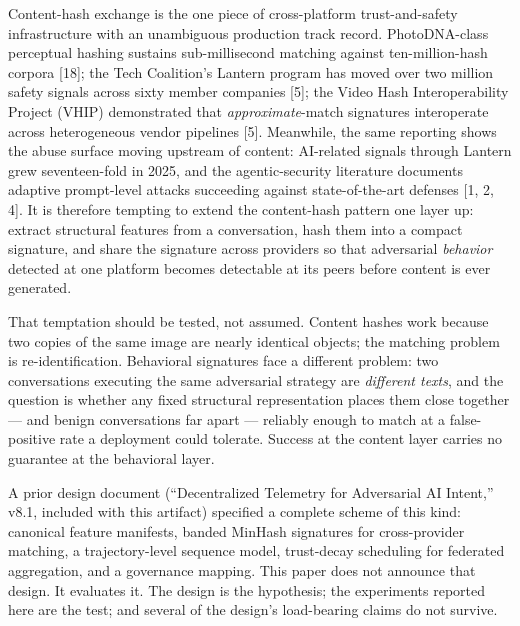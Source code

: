 \documentclass[11pt]{article}
\begin{document}
Content-hash exchange is the one piece of cross-platform trust-and-safety infrastructure with an unambiguous production track record. PhotoDNA-class perceptual hashing sustains sub-millisecond matching against ten-million-hash corpora [18]; the Tech Coalition's Lantern program has moved over two million safety signals across sixty member companies [5]; the Video Hash Interoperability Project (VHIP) demonstrated that \emph{approximate}-match signatures interoperate across heterogeneous vendor pipelines [5]. Meanwhile, the same reporting shows the abuse surface moving upstream of content: AI-related signals through Lantern grew seventeen-fold in 2025, and the agentic-security literature documents adaptive prompt-level attacks succeeding against state-of-the-art defenses [1, 2, 4]. It is therefore tempting to extend the content-hash pattern one layer up: extract structural features from a conversation, hash them into a compact signature, and share the signature across providers so that adversarial \emph{behavior} detected at one platform becomes detectable at its peers before content is ever generated.

That temptation should be tested, not assumed. Content hashes work because two copies of the same image are nearly identical objects; the matching problem is re-identification. Behavioral signatures face a different problem: two conversations executing the same adversarial strategy are \emph{different texts}, and the question is whether any fixed structural representation places them close together --- and benign conversations far apart --- reliably enough to match at a false-positive rate a deployment could tolerate. Success at the content layer carries no guarantee at the behavioral layer.

A prior design document (``Decentralized Telemetry for Adversarial AI Intent,'' v8.1, included with this artifact) specified a complete scheme of this kind: canonical feature manifests, banded MinHash signatures for cross-provider matching, a trajectory-level sequence model, trust-decay scheduling for federated aggregation, and a governance mapping. This paper does not announce that design. It evaluates it. The design is the hypothesis; the experiments reported here are the test; and several of the design's load-bearing claims do not survive.
\end{document}
